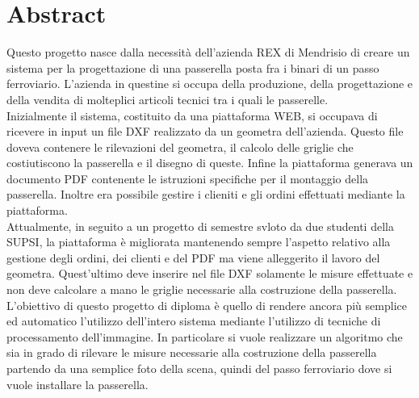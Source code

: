 \documentclass[twoside]{supsistudent}
\begin{document}
\maketitle
\onehalfspacing
\frontmatter


\tableofcontents

\mainmatter %
\setcounter{page}{1}

\chapter{Abstract}
Questo progetto nasce dalla necessità dell'azienda REX di Mendrisio di creare un sistema per la progettazione di una 
passerella posta fra i binari di un passo ferroviario. L'azienda in questine si occupa della produzione, della 
progettazione e della vendita di molteplici articoli tecnici tra i quali le passerelle. \\

Inizialmente il sistema, costituito da una piattaforma WEB, si occupava di ricevere in input un file DXF realizzato da un geometra 
dell'azienda. Questo file doveva contenere le rilevazioni del geometra, il calcolo delle griglie che costiutiscono la passerella e 
il disegno di queste. Infine la piattaforma generava un documento PDF contenente le istruzioni specifiche per il montaggio della passerella.
Inoltre era possibile gestire i clieniti e gli ordini effettuati mediante la piattaforma. \\

Attualmente, in seguito a un progetto di semestre svloto da due studenti della SUPSI, la piattaforma è migliorata mantenendo sempre 
l'aspetto relativo alla gestione degli ordini, dei clienti e del PDF ma viene alleggerito il lavoro del geometra. Quest'ultimo deve inserire 
nel file DXF solamente le misure effettuate e non deve calcolare a mano le griglie necessarie alla costruzione della passerella. \\

L'obiettivo di questo progetto di diploma è quello di rendere ancora più semplice ed automatico l'utilizzo dell'intero sistema mediante l'utilizzo 
di tecniche di processamento dell'immagine. In particolare si vuole realizzare un algoritmo che sia in grado di rilevare le misure necessarie alla costruzione
della passerella partendo da una semplice foto della scena, quindi del passo ferroviario dove si vuole installare la passerella. \\
\end{document}
